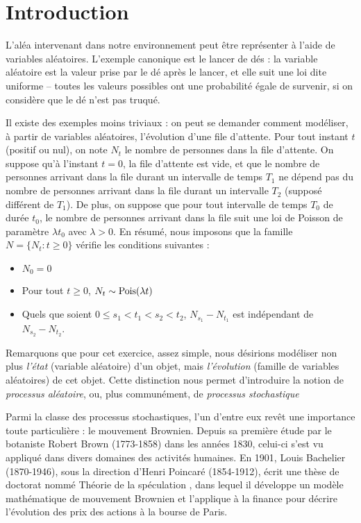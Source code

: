 \chapter*{Introduction}

L'aléa intervenant dans notre environnement peut être représenter à
l'aide de variables aléatoires. L'exemple canonique est le lancer de
dés : la variable aléatoire est la valeur prise par le dé après le
lancer, et elle suit une loi dite uniforme -- toutes les valeurs
possibles ont une probabilité égale de survenir, si on considère que
le dé n'est pas truqué.

Il existe des exemples moins triviaux : on peut se demander comment
modéliser, à partir de variables aléatoires, l'évolution d'une file
d'attente. Pour tout instant $t$ (positif ou nul), on note $N_t$ le
nombre de personnes dans la file d'attente. On suppose qu'à l'instant
$t=0$, la file d'attente est vide, et que le nombre de personnes
arrivant dans la file durant un intervalle de temps $T_1$ ne dépend
pas du nombre de personnes arrivant dans la file durant un intervalle
$T_2$ (supposé différent de $T_1$). De plus, on suppose que pour tout
intervalle de temps $T_0$ de durée $t_0$, le nombre de personnes
arrivant dans la file suit une loi de Poisson de paramètre $\lambda
t_0$ avec $\lambda>0$. En résumé, nous imposons que la famille
$N=\{N_t:t\geq 0\}$ vérifie les conditions suivantes :
\begin{itemize}
\item $N_0 = 0$
\item Pour tout $t\geq 0$, $N_t \sim \operatorname{Pois}(\lambda t)$
\item Quels que soient $0\leq s_1<t_1<s_2<t_2$, $N_{s_1} - N_{t_1}$
  est indépendant de $N_{s_2} - N_{t_2}$.
\end{itemize}
Remarquons que pour cet exercice, assez simple, nous désirions
modéliser non plus \emph{l'état} (variable aléatoire) d'un objet, mais
\emph{l'évolution} (famille de variables aléatoires) de cet
objet. Cette distinction nous permet d'introduire la notion de
\emph{processus aléatoire}, ou, plus communément, de \emph{processus
  stochastique}

Parmi la classe des processus stochastiques, l'un d'entre eux revêt
une importance toute particulière : le mouvement Brownien. Depuis sa
première étude par le botaniste Robert Brown (1773-1858) dans les
années 1830, celui-ci s'est vu appliqué dans divers domaines des
activités humaines. En 1901, Louis Bachelier (1870-1946), sous la
direction d'Henri Poincaré (1854-1912), écrit une thèse de doctorat
nommé \og Théorie de la spéculation \fg{}, dans lequel il développe un
modèle mathématique de mouvement Brownien et l'applique à la finance
pour décrire l'évolution des prix des actions à la bourse de
Paris.

